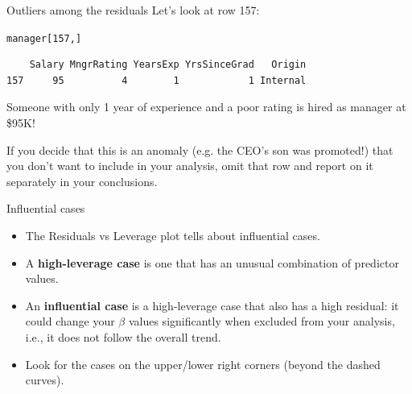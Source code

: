 \documentclass{beamer}\usepackage[]{graphicx}\usepackage[]{color}
\makeatletter
\newcommand{\hlnum}[1]{\textcolor[rgb]{0.824,0.412,0.118}{#1}}%
\newcommand{\hlstd}[1]{\textcolor[rgb]{1,0.894,0.769}{#1}}%
\newenvironment{kframe}{%
 \def\at@end@of@kframe{}%
 \ifinner\ifhmode%
  \def\at@end@of@kframe{\end{minipage}}%
  \begin{minipage}{\columnwidth}%
 \fi\fi%
 \def\FrameCommand##1{\hskip\@totalleftmargin \hskip-\fboxsep
 \colorbox{shadecolor}{##1}\hskip-\fboxsep
     \hskip-\linewidth \hskip-\@totalleftmargin \hskip\columnwidth}%
 \MakeFramed {\advance\hsize-\width
   \@totalleftmargin\z@ \linewidth\hsize
   \@setminipage}}%
 {\par\unskip\endMakeFramed%
 \at@end@of@kframe}
\newenvironment{knitrout}{}{} %
\makeatother
\begin{document}
\begin{darkframes}
\begin{frame}[fragile]{Outliers among the residuals}
      Let's look at row 157:
\begin{knitrout}
\begin{kframe}
\begin{alltt}
\hlstd{manager[}\hlnum{157}\hlstd{,]}
\end{alltt}
\begin{verbatim}
    Salary MngrRating YearsExp YrsSinceGrad   Origin
157     95          4        1            1 Internal
\end{verbatim}
\end{kframe}
\end{knitrout}
      Someone with only 1 year of experience and a poor rating is hired as manager at \$95K! \pause \bigskip

      If you decide that this is an anomaly (e.g. the CEO's son was promoted!) that you don't want to include in your analysis, omit that row and report on it separately in your conclusions.
\end{frame}


\begin{frame}[fragile]{Influential cases}
      \begin{itemize}[<+->]
        \item The Residuals vs Leverage plot tells about \alert{influential cases}.
        \item A \textbf{high-leverage case} is one that has an unusual combination of predictor values.
        \item An \textbf{influential case} is a high-leverage case that also has a high residual: it could change your $\beta$ values significantly when excluded from your analysis, i.e., it does not follow the overall trend.
        \item Look for the cases on the upper/lower right corners (beyond the dashed curves).
      \end{itemize}
\end{frame}


  \end{darkframes}

  
\end{document}
